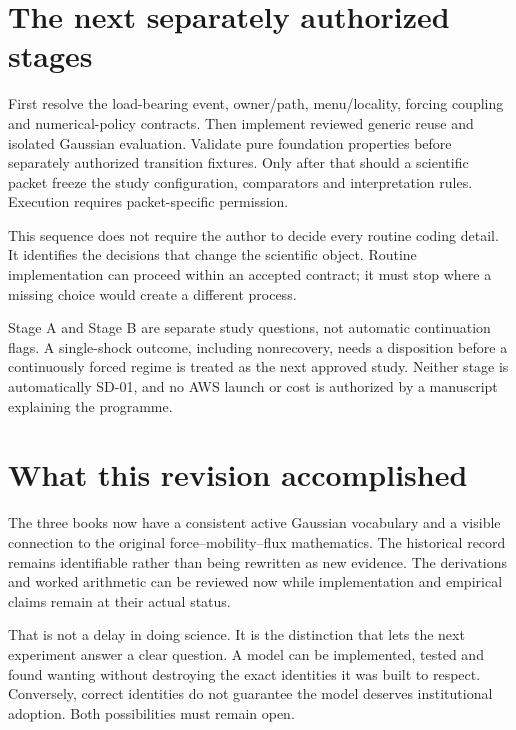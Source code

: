 \section{The next separately authorized stages}
First resolve the load-bearing event, owner/path, menu/locality, forcing
coupling and numerical-policy contracts. Then implement reviewed generic
reuse and isolated Gaussian evaluation. Validate pure foundation properties
before separately authorized transition fixtures. Only after that should a
scientific packet freeze the study configuration, comparators and
interpretation rules. Execution requires packet-specific permission.

This sequence does not require the author to decide every routine coding
detail. It identifies the decisions that change the scientific object.
Routine implementation can proceed within an accepted contract; it must
stop where a missing choice would create a different process.

Stage A and Stage B are separate study questions, not automatic continuation
flags. A single-shock outcome, including nonrecovery, needs a disposition
before a continuously forced regime is treated as the next approved study.
Neither stage is automatically SD-01, and no AWS launch or cost is authorized
by a manuscript explaining the programme.

\section{What this revision accomplished}
The three books now have a consistent active Gaussian vocabulary and a
visible connection to the original force--mobility--flux mathematics. The
historical record remains identifiable rather than being rewritten as new
evidence. The derivations and worked arithmetic can be reviewed now while
implementation and empirical claims remain at their actual status.

That is not a delay in doing science. It is the distinction that lets the
next experiment answer a clear question. A model can be implemented, tested
and found wanting without destroying the exact identities it was built to
respect. Conversely, correct identities do not guarantee the model deserves
institutional adoption. Both possibilities must remain open.
